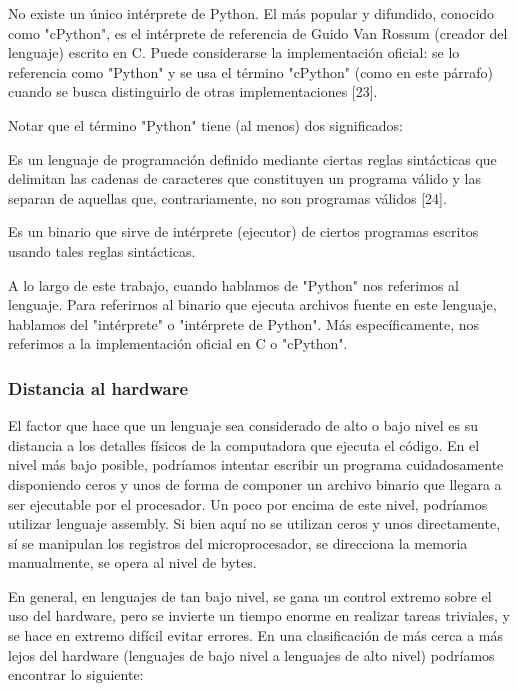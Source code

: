 \documentclass[]{article}
\begin{document}
No existe un único intérprete de Python. El más popular y difundido, conocido
como "cPython", es el intérprete de referencia de Guido Van Rossum (creador del
lenguaje) escrito en C. Puede considerarse la implementación oficial: se lo
referencia como "Python" y se usa el término "cPython" (como en este párrafo)
cuando se busca distinguirlo de otras implementaciones [23].

Notar que el término "Python" tiene (al menos) dos significados:


Es un lenguaje de programación definido mediante ciertas reglas sintácticas que
delimitan las cadenas de caracteres que constituyen un programa válido y las
separan de aquellas que, contrariamente, no son programas válidos [24].

Es un binario que sirve de intérprete (ejecutor) de ciertos programas escritos
usando tales reglas sintácticas.

A lo largo de este trabajo, cuando hablamos de "Python" nos referimos al
lenguaje. Para referirnos al binario que ejecuta archivos fuente en este
lenguaje, hablamos del "intérprete" o "intérprete de Python". Más
específicamente, nos referimos a la implementación oficial en C o "cPython". 

\subsubsection{Distancia al hardware}

El factor que hace que un lenguaje sea considerado de alto o bajo nivel es su
distancia a los detalles físicos de la computadora que ejecuta el código.
En el nivel más bajo posible, podríamos intentar escribir un programa
cuidadosamente disponiendo ceros y unos de forma de componer un archivo binario
que llegara a ser ejecutable por el procesador. Un poco por encima de este
nivel, podríamos utilizar lenguaje assembly. Si bien aquí no se utilizan ceros
y unos directamente, sí se manipulan los registros del microprocesador, se
direcciona la memoria manualmente, se opera al nivel de bytes.

En general, en lenguajes de tan bajo nivel, se gana un control extremo sobre el
uso del hardware, pero se invierte un tiempo enorme en realizar tareas
triviales, y se hace en extremo difícil evitar errores. En una clasificación de
más cerca a más lejos del hardware (lenguajes de bajo nivel a lenguajes de alto
nivel) podríamos encontrar lo siguiente:
\end{document}
